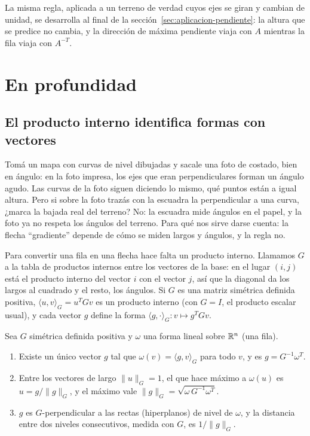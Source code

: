 La misma regla, aplicada a un terreno de verdad cuyos ejes se giran y cambian de unidad, se
desarrolla al final de la sección~\ref{sec:aplicacion-pendiente}: la altura que se predice no
cambia, y la dirección de máxima pendiente viaja con \(A\) mientras la fila viaja con
\(A^{-T}\).

\section{En profundidad}

\subsection{El producto interno identifica formas con vectores}\label{sec:formas-metrica}

Tomá un mapa con curvas de nivel dibujadas y sacale una foto de costado, bien en ángulo: en la
foto impresa, los ejes que eran perpendiculares forman un ángulo agudo. Las curvas de la foto
siguen diciendo lo mismo, qué puntos están a igual altura. Pero si sobre la foto trazás con la
escuadra la perpendicular a una curva, ¿marca la bajada real del terreno? No: la escuadra mide
ángulos en el papel, y la foto ya no respeta los ángulos del terreno.
Para qué nos sirve darse cuenta: la flecha \enquote{gradiente} depende de cómo se miden largos
y ángulos, y la regla no.

Para convertir una fila en una flecha hace falta un producto interno. Llamamos \(G\) a la
tabla de productos internos entre los vectores de la base: en el lugar \((i,j)\) está el
producto interno del vector \(i\) con el vector \(j\), así que la diagonal da los largos al
cuadrado y el resto, los ángulos. Si \(G\) es una matriz
simétrica definida positiva, \(\langle u,v\rangle_G=u^TGv\) es un producto interno (con
\(G=I\), el producto escalar usual), y cada vector \(g\) define la forma
\(\langle g,\cdot\rangle_G\colon v\mapsto g^TGv\).

\begin{proposicion}\label{prop:vector-asociado}
Sea \(G\) simétrica definida positiva y \(\omega\) una forma lineal sobre \(\mathbb{R}^n\) (una fila).
\begin{enumerate}[label=(\alph*)]
  \item Existe un único vector \(g\) tal que \(\omega(v)=\langle g,v\rangle_G\) para todo
  \(v\), y es \(g=G^{-1}\omega^T\).
  \item Entre los vectores de largo \(\lVert u\rVert_G=1\), el que hace máximo a
  \(\omega(u)\) es \(u=g/\lVert g\rVert_G\), y el máximo vale
  \(\lVert g\rVert_G=\sqrt{\omega\,G^{-1}\omega^T}\).
  \item \(g\) es \(G\)-perpendicular a las rectas (hiperplanos) de nivel de \(\omega\), y la
  distancia entre dos niveles consecutivos, medida con \(G\), es \(1/\lVert g\rVert_G\).
\end{enumerate}
\end{proposicion}

